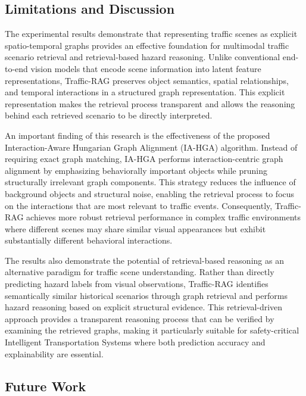 \documentclass[a4paper, 11pt]{article} %
\begin{document}
\subsection{Limitations and Discussion}


The experimental results demonstrate that representing traffic scenes as explicit spatio-temporal graphs provides an effective foundation for multimodal traffic scenario retrieval and retrieval-based hazard reasoning. Unlike conventional end-to-end vision models that encode scene information into latent feature representations, Traffic-RAG preserves object semantics, spatial relationships, and temporal interactions in a structured graph representation. This explicit representation makes the retrieval process transparent and allows the reasoning behind each retrieved scenario to be directly interpreted.

An important finding of this research is the effectiveness of the proposed Interaction-Aware Hungarian Graph Alignment (IA-HGA) algorithm. Instead of requiring exact graph matching, IA-HGA performs interaction-centric graph alignment by emphasizing behaviorally important objects while pruning structurally irrelevant graph components. This strategy reduces the influence of background objects and structural noise, enabling the retrieval process to focus on the interactions that are most relevant to traffic events. Consequently, Traffic-RAG achieves more robust retrieval performance in complex traffic environments where different scenes may share similar visual appearances but exhibit substantially different behavioral interactions.

The results also demonstrate the potential of retrieval-based reasoning as an alternative paradigm for traffic scene understanding. Rather than directly predicting hazard labels from visual observations, Traffic-RAG identifies semantically similar historical scenarios through graph retrieval and performs hazard reasoning based on explicit structural evidence. This retrieval-driven approach provides a transparent reasoning process that can be verified by examining the retrieved graphs, making it particularly suitable for safety-critical Intelligent Transportation Systems where both prediction accuracy and explainability are essential.

\subsection{Future Work}




\end{document}
